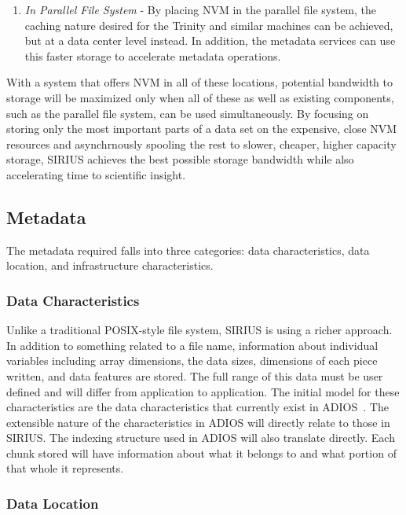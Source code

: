 \begin{enumerate}
\item {\em In Parallel File System} - By placing NVM in the parallel file
system, the caching nature desired for the Trinity and similar machines can be
achieved, but at a data center level instead. In addition, the metadata
services can use this faster storage to accelerate metadata operations.

\end{enumerate}

With a system that offers NVM in all of these locations, potential bandwidth to
storage will be maximized only when all of these as well as existing
components, such as the parallel file system, can be used simultaneously. By
focusing on storing only the most important parts of a data set on the
expensive, close NVM resources and asynchrnously spooling the rest to slower,
cheaper, higher capacity storage, SIRIUS achieves the best possible storage
bandwidth while also accelerating time to scientific insight.

\subsection{Metadata}

The metadata required falls into three categories: data characteristics, data
location, and infrastructure characteristics.

\subsubsection{Data Characteristics}

Unlike a traditional POSIX-style file system, SIRIUS is using a richer
approach.  In addition to something related to a file name, information about
individual variables including array dimensions, the data sizes, dimensions of
each piece written, and data features are stored. The full range of this data
must be user defined and will differ from application to application. The
initial model for these characteristics are the data characteristics that
currently exist in ADIOS~\cite{lofstead:2009:adaptable}. The extensible nature
of the characteristics in ADIOS will directly relate to those in SIRIUS. The
indexing structure used in ADIOS will also translate directly. Each chunk
stored will have information about what it belongs to and what portion of that
whole it represents.

\subsubsection{Data Location}

